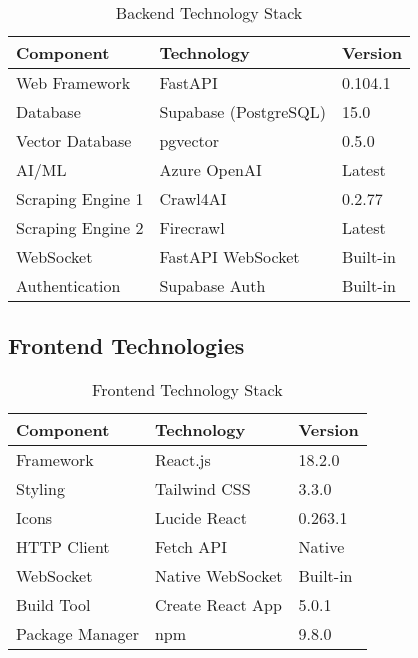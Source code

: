 \documentclass[12pt,a4paper]{report}
\begin{document}
\begin{table}[H]
    \centering
    \caption{Backend Technology Stack}
    \label{tab:backend-tech}
    \begin{tabular}{|l|l|l|}
        \hline
        \textbf{Component} & \textbf{Technology} & \textbf{Version} \\
        \hline
        Web Framework & FastAPI & 0.104.1 \\
        \hline
        Database & Supabase (PostgreSQL) & 15.0 \\
        \hline
        Vector Database & pgvector & 0.5.0 \\
        \hline
        AI/ML & Azure OpenAI & Latest \\
        \hline
        Scraping Engine 1 & Crawl4AI & 0.2.77 \\
        \hline
        Scraping Engine 2 & Firecrawl & Latest \\
        \hline
        WebSocket & FastAPI WebSocket & Built-in \\
        \hline
        Authentication & Supabase Auth & Built-in \\
        \hline
    \end{tabular}
\end{table}

\subsection{Frontend Technologies}

\begin{table}[H]
    \centering
    \caption{Frontend Technology Stack}
    \label{tab:frontend-tech}
    \begin{tabular}{|l|l|l|}
        \hline
        \textbf{Component} & \textbf{Technology} & \textbf{Version} \\
        \hline
        Framework & React.js & 18.2.0 \\
        \hline
        Styling & Tailwind CSS & 3.3.0 \\
        \hline
        Icons & Lucide React & 0.263.1 \\
        \hline
        HTTP Client & Fetch API & Native \\
        \hline
        WebSocket & Native WebSocket & Built-in \\
        \hline
        Build Tool & Create React App & 5.0.1 \\
        \hline
        Package Manager & npm & 9.8.0 \\
        \hline
    \end{tabular}
\end{table}
\end{document}
